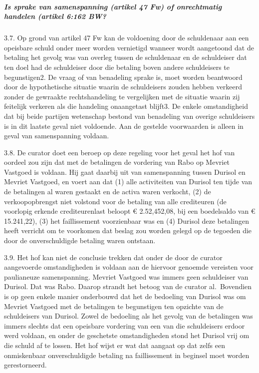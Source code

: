 \documentclass[
  dutch,
  a4paper,
]{article}
\begin{document}
\subparagraph{Is sprake van samenspanning (artikel 47 Fw) of onrechtmatig handelen (artikel 6:162 BW?}\label{is-sprake-van-samenspanning-artikel-47-fw-of-onrechtmatig-handelen-artikel-6162-bw}

3.7. Op grond van artikel 47 Fw kan de voldoening door de schuldenaar aan een opeisbare schuld onder meer worden vernietigd wanneer wordt aangetoond dat de betaling het gevolg was van overleg tussen de schuldenaar en de schuldeiser dat ten doel had de schuldeiser door die betaling boven andere schuldeisers te begunstigen2. De vraag of van benadeling sprake is, moet worden beantwoord door de hypothetische situatie waarin de schuldeisers zouden hebben verkeerd zonder de gewraakte rechtshandeling te vergelijken met de situatie waarin zij feitelijk verkeren als die handeling onaangetast blijft3. De enkele omstandigheid dat bij beide partijen wetenschap bestond van benadeling van overige schuldeisers is in dit laatste geval niet voldoende. Aan de gestelde voorwaarden is alleen in geval van samenspanning voldaan.

3.8. De curator doet een beroep op deze regeling voor het geval het hof van oordeel zou zijn dat met de betalingen de vordering van Rabo op Mevriet Vastgoed is voldaan. Hij gaat daarbij uit van samenspanning tussen Durisol en Mevriet Vastgoed, en voert aan dat (1) alle activiteiten van Durisol ten tijde van de betalingen al waren gestaakt en de activa waren verkocht, (2) de verkoopopbrengst niet volstond voor de betaling van alle crediteuren (de voorlopig erkende crediteurenlast beloopt € 2.52,452,08, bij een boedelsaldo van € 15.241,22), (3) het faillissement voorzienbaar was en (4) Durisol deze betalingen heeft verricht om te voorkomen dat beslag zou worden gelegd op de tegoeden die door de onverschuldigde betaling waren ontstaan.

3.9. Het hof kan niet de conclusie trekken dat onder de door de curator aangevoerde omstandigheden is voldaan aan de hiervoor genoemde vereisten voor paulianeuze samenspanning. Mevriet Vastgoed was immers geen schuldeiser van Durisol. Dat was Rabo. Daarop strandt het betoog van de curator al.~Bovendien is op geen enkele manier onderbouwd dat het de bedoeling van Durisol was om Mevriet Vastgoed met de betalingen te begunstigen ten opzichte van de schuldeisers van Durisol. Zowel de bedoeling als het gevolg van de betalingen was immers slechts dat een opeisbare vordering van een van die schuldeisers erdoor werd voldaan, en onder de geschetste omstandigheden stond het Durisol vrij om die schuld af te lossen. Het hof wijst er wat dat aangaat op dat zelfs een onmiskenbaar onverschuldigde betaling na faillissement in beginsel moet worden gerestorneerd.
\end{document}

